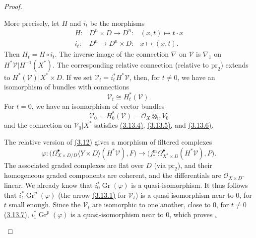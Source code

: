 \documentclass{report}
\renewcommand{\cal}[1]{{\mathcal{#1}}}
\newcommand{\CC}{\mathbb{C}}
\newcommand{\pr}{\mathrm{pr}}
\DeclareMathOperator{\Gr}{Gr}
\newcommand{\oldpage}[1]{\marginpar{\footnotesize$\Big\vert$ \textit{p.~#1}}}
\begin{document}
\begin{proof}
\begin{itemize}
      More precisely, let $H$ and $i_t$ be the morphisms
      \[
        \begin{aligned}
          H\colon &D^n\times D \to D^n
          \colon &(x,t) \mapsto t\cdot x
        \\i_t\colon &D^n \to D^n\times D
          \colon &x\mapsto (x,t).
        \end{aligned}
      \]
      Then $H_t=H\circ i_t$.
      The inverse image of the connection $\nabla$ on $\cal{V}$ is $\nabla_1$ on $H^*\cal{V}|H^{-1}(X^*)$.
      The corresponding relative connection (relative to $\pr_2$) extends to $H^*(\cal{V})|X^*\times D$.
      If we set $\cal{V}_t=i_t^*H^*\cal{V}$, then, for $t\neq0$, we have an isomorphism of bundles with connections
      \[
      \label{II.3.13.7}
        \cal{V}_t \cong H_t^*(\cal{V}).
      \tag{3.13.7}
      \]
      For $t=0$, we have an isomorphism of vector bundles
\oldpage{84}
      \[
      \label{II.3.13.8}
        \cal{V}_0 = H_0^*(\cal{V}) = \cal{O}_X\otimes_{\CC}V_0
      \tag{3.13.8}
      \]
      and the connection on $\cal{V}_0|X^*$ satisfies \hyperref[II.3.13.4]{(3.13.4)}, \hyperref[II.3.13.5]{(3.13.5)}, and \hyperref[II.3.13.6]{(3.13.6)}.

      The relative version of \hyperref[II.3.12]{(3.12)} gives a morphism of filtered complexes
      \[
      \label{II.3.13.9}
        \varphi\colon
        \big(
          \Omega_{X\times D/D}^\bullet\langle Y\times D\rangle(H^*\cal{V}),F
        \big)
        \to
        \big(
          j_*^\mathrm{m}\Omega_{X^*\times D}^\bullet(H^*\cal{V}),P
        \big).
      \tag{3.13.9}
      \]
      The associated graded complexes are flat over $D$ (via $\pr_2$), and their homogeneous graded components are coherent, and the differentials are $\cal{O}_{X\times D}$-linear.
      We already know that $i_0^*\Gr(\varphi)$ is a quasi-isomorphism.
      It thus follows that $i_t^*\Gr^p(\varphi)$ (the arrow \hyperref[II.3.13.1]{(3.13.1)} for $\cal{V}_t$) is a quasi-isomorphism near to $0$, for $t$ small enough.
      Since the $\cal{V}_t$ are isomorphic to one another, close to $0$, for $t\neq0$ \hyperref[II.3.13.7]{(3.13.7)}, $i_1^*\Gr^p(\varphi)$ is a quasi-isomorphism near to $0$, which proves \hyperref[II.3.13].
  \end{itemize}
\end{proof}
\end{document}
